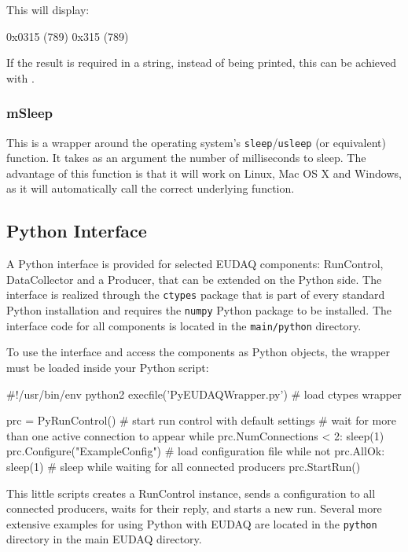 This will display:
\begin{listing}[]
0x0315 (789)
0x315 (789)
\end{listing}

If the result is required in a string, instead of being printed,
this can be achieved with .

\subsubsection{mSleep}\label{sec:mSleep}
This is a wrapper around the operating system's \texttt{sleep}/\texttt{usleep}
(or equivalent) function.
It takes as an argument the number of milliseconds to sleep.
The advantage of this function is that it will work on Linux,
Mac OS X and Windows, as it will automatically call the correct underlying function.

\subsection{Python Interface}
\label{sssec:pywrapper}
A Python interface is provided for selected EUDAQ components:
RunControl, DataCollector and a Producer, that can be extended on the
Python side. The interface is realized through the \texttt{ctypes}
package that is part of every standard Python installation and
requires the \texttt{numpy} Python package to be installed. The
interface code for all components is located in the
\texttt{main/python} directory.

To use the interface and access the components as Python objects, the
wrapper must be loaded inside your Python script:

\begin{listing}[python]
  #!/usr/bin/env python2 
  execfile('PyEUDAQWrapper.py') # load ctypes wrapper

  prc = PyRunControl() # start run control with default settings
  # wait for more than one active connection to appear
  while prc.NumConnections < 2:
      sleep(1)
  prc.Configure("ExampleConfig") # load configuration file
  while not prc.AllOk:
      sleep(1) # sleep while waiting for all connected producers
  prc.StartRun()
\end{listing}

This little scripts creates a RunControl instance, sends a
configuration to all connected producers, waits for their reply, and
starts a new run. Several more extensive examples for using Python
with EUDAQ are located in the \texttt{python} directory in the main
EUDAQ directory.

